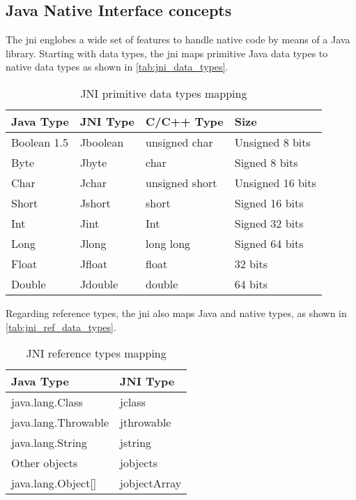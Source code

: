 \subsection{Java Native Interface concepts}

The \gls{jni} englobes a wide set of features to handle native code by means of a Java library. Starting with data types, the \gls{jni} maps primitive Java data types to native data types as shown in \autoref{tab:jni_data_types}.

\begin{table}[h]
\begin{center}
\begin{tabular}{| l | l | l | l |}
\hline
\textbf{Java Type} & \textbf{JNI Type} & \textbf{C/C++ Type} & \textbf{Size}\\
\hline
Boolean 1.5 & Jboolean & unsigned char & Unsigned 8 bits\\
\hline
Byte & Jbyte & char & Signed 8 bits\\
\hline
Char & Jchar & unsigned short & Unsigned 16 bits\\
\hline
Short & Jshort & short & Signed 16 bits\\
\hline
Int & Jint & Int & Signed 32 bits\\
\hline
Long & Jlong & long long & Signed 64 bits\\
\hline
Float & Jfloat & float & 32 bits\\
\hline
Double & Jdouble & double & 64 bits\\
\hline
\end{tabular}
\end{center}
\caption{JNI primitive data types mapping}
\label{tab:jni_data_types}
\end{table}

Regarding reference types, the \gls{jni} also maps Java and native types, as shown in \autoref{tab:jni_ref_data_types}.

\begin{table}[h]
\begin{center}
\begin{tabular}{| l | l |}
\hline
\textbf{Java Type} & \textbf{JNI Type}\\
\hline
java.lang.Class & jclass\\
\hline
java.lang.Throwable & jthrowable\\
\hline
java.lang.String & jstring\\
\hline
Other objects & jobjects\\
\hline
java.lang.Object[] & jobjectArray\\
\hline
\end{tabular}
\end{center}
\caption{JNI reference types mapping}
\label{tab:jni_ref_data_types}
\end{table}

